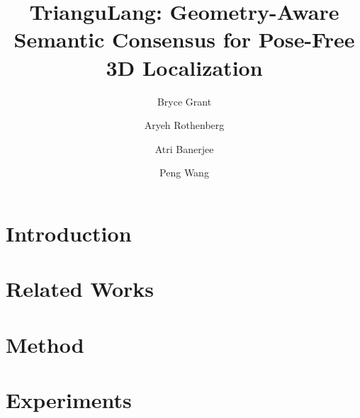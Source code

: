 \documentclass{llncs}
\begin{document}
\title{TrianguLang: Geometry-Aware Semantic Consensus for Pose-Free 3D Localization} 


\author{Bryce Grant \and
Aryeh Rothenberg \and Atri Banerjee \and Peng Wang}



\maketitle


\begin{abstract}
 
\end{abstract}


\section{Introduction}
\label{sec:introduction}


\section{Related Works}
\label{sec:related}


\section{Method}
\label{sec:method}


\section{Experiments}

\end{document}
